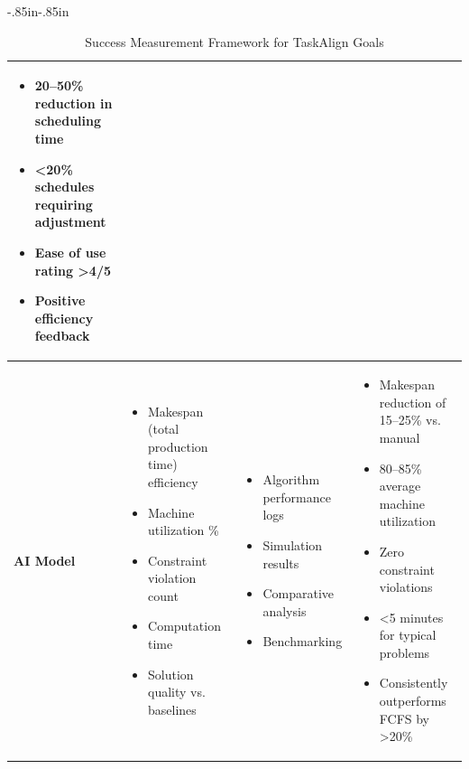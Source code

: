 \begin{table}[H]
\begin{adjustwidth}{-.85in}{-.85in}
\begin{tabularx}{1.3\textwidth}{|l|X|X|X|}
        \begin{itemize}[nosep,leftmargin=*,topsep=2pt, partopsep=0pt, itemsep=1pt]
            \item 20--50\% reduction in scheduling time
            \item <20\% schedules requiring adjustment
            \item Ease of use rating >4/5
            \item Positive efficiency feedback
        \end{itemize} \\
        \hline
        \textbf{AI Model} &
        \begin{itemize}[nosep,leftmargin=*,topsep=2pt, partopsep=0pt, itemsep=1pt]
            \item Makespan (total production time) efficiency
            \item Machine utilization \%
            \item Constraint violation count
            \item Computation time
            \item Solution quality vs. baselines
        \end{itemize} &
        \begin{itemize}[nosep,leftmargin=*,topsep=2pt, partopsep=0pt, itemsep=1pt]
            \item Algorithm performance logs
            \item Simulation results
            \item Comparative analysis
            \item Benchmarking
        \end{itemize} &
        \begin{itemize}[nosep,leftmargin=*,topsep=2pt, partopsep=0pt, itemsep=1pt]
            \item Makespan reduction of 15--25\% vs. manual
            \item 80--85\% average machine utilization
            \item Zero constraint violations
            \item <5 minutes for typical problems
            \item Consistently outperforms FCFS by >20\%
        \end{itemize} \\
        \hline
    \end{tabularx}
    \end{adjustwidth}
    \caption{Success Measurement Framework for TaskAlign Goals}

\end{table}

